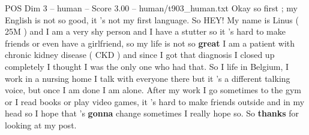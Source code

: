 \begin{textsample}{POS Dim 3 – human – Score 3.00 – human/t903\_human.txt}  \label{ex:f3_pos_011}
Okay so first ; my English is not so good, it ’s not my first language.
So HEY!
My name is Linus ( 25M ) and I am a very shy person and I have a stutter so it ’s hard to make friends or even have a girlfriend, so my life is not so \textbf{great} I am a patient with chronic kidney disease ( CKD ) and since I got that diagnosis I closed up completely I thought I was the only one who had that.
So I life in Belgium, I work in a nursing home I talk with everyone there but it ’s a different talking voice, but once I am done I am alone.
After my work I go sometimes to the gym or I read books or play video games, it ’s hard to make friends outside and in my head so I hope that ’s \textbf{gonna} change sometimes I really hope so.
So \textbf{thanks} for looking at my post.

\end{textsample}

